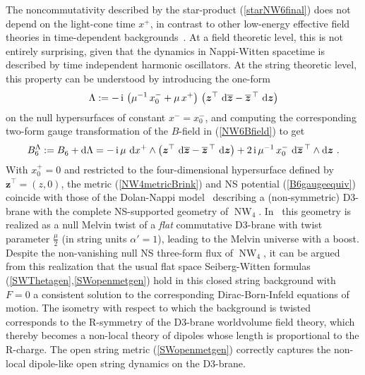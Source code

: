 \documentclass[11pt,a4paper]{article}
\DeclareMathOperator{\NW}{NW}
\newcommand{\ii}{{\rm i}}
\newcommand{\mbf}[1]{{\boldsymbol {#1} }}
\def\ii{{\,{\rm i}\,}}
\def\dd{{\rm d}}
\def\mz{{\mbf z}}
\newcommand{\beq}{\begin{eqnarray}}
\newcommand{\eeq}{\end{eqnarray}}
\begin{document}
The noncommutativity described by the star-product
(\ref{starNW6final}) does not depend on the light-cone time $x^+$, in
contrast to other low-energy effective field theories in
time-dependent backgrounds~\cite{DRRS1,HS1}. At a field theoretic
level, this is not entirely surprising, given that the dynamics in
Nappi-Witten spacetime is described by time independent harmonic
oscillators. At the string theoretic level, this property can be
understood by introducing the one-form
\beq
\Lambda:=-\ii\left(\mu^{-1}\,x_0^-+\mu\,x^+\right)\,\left(
\mz^\top~\dd\overline{\mz}-\overline{\mz}{}^{\,\top}~\dd\mz
\right)
\label{Lambdadef}\eeq
on the null hypersurfaces of constant $x^-=x_0^-$, and computing the
corresponding two-form gauge transformation of the $B$-field in
(\ref{NW6Bfield}) to get
\beq
B_6^\Lambda:=B^{~}_6+\dd\Lambda=-\ii\mu~\dd x^+\wedge\left(
\mz^\top~\dd\overline{\mz}-\overline{\mz}{}^{\,\top}~\dd\mz
\right)+2\ii\mu^{-1}\,x_0^-~\dd\overline{\mz}{}^{\,\top}
\wedge\dd\mz \ .
\label{B6gaugeequiv}\eeq
With $x_0^+=0$ and restricted to the four-dimensional hypersurface
defined by $\mz^\top=(z,0)$, the metric (\ref{NW4metricBrink}) and NS
potential (\ref{B6gaugeequiv}) coincide with those of the Dolan-Nappi
model~\cite{DN1} describing a (non-symmetric) D3-brane with the complete
NS-supported geometry of $\NW_4$. In~\cite{HT1} this geometry is
realized as a null Melvin twist of a {\it flat} commutative D3-brane
with twist parameter $\frac\mu2$ (in string units $\alpha'=1$),
leading to the Melvin universe with a boost. Despite the
non-vanishing null NS three-form flux of $\NW_4$, it can be argued
from this realization that the usual flat space Seiberg-Witten formulas
(\ref{SWThetagen},\ref{SWopenmetgen}) hold in this closed string
background with $F=0$ a consistent solution to the corresponding
Dirac-Born-Infeld equations of motion. The
isometry with respect to which the background is twisted corresponds
to the R-symmetry of the D3-brane worldvolume field theory, which
thereby becomes a non-local theory of dipoles whose length is
proportional to the R-charge. The open string metric
(\ref{SWopenmetgen}) correctly captures the non-local dipole-like open
string dynamics on the D3-brane.
\end{document}
